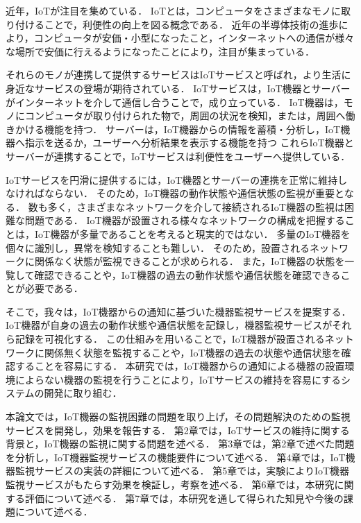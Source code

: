 
近年，IoTが注目を集めている．
IoTとは，コンピュータをさまざまなモノに取り付けることで，利便性の向上を図る概念である．
近年の半導体技術の進歩により，コンピュータが安価・小型になったこと，インターネットへの通信が様々な場所で安価に行えるようになったことにより，注目が集まっている．
\medskip

それらのモノが連携して提供するサービスはIoTサービスと呼ばれ，より生活に身近なサービスの登場が期待されている．
IoTサービスは，IoT機器とサーバーがインターネットを介して通信し合うことで，成り立っている．
IoT機器は，モノにコンピュータが取り付けられた物で，周囲の状況を検知，または，周囲へ働きかける機能を持つ．
サーバーは，IoT機器からの情報を蓄積・分析し，IoT機器へ指示を送るか，ユーザーへ分析結果を表示する機能を持つ
これらIoT機器とサーバーが連携することで，IoTサービスは利便性をユーザーへ提供している．
\medskip

IoTサービスを円滑に提供するには，IoT機器とサーバーの連携を正常に維持しなければならない．
そのため，IoT機器の動作状態や通信状態の監視が重要となる．
数も多く，さまざまなネットワークを介して接続されるIoT機器の監視は困難な問題である．
IoT機器が設置される様々なネットワークの構成を把握することは，IoT機器が多量であることを考えると現実的ではない．
多量のIoT機器を個々に識別し，異常を検知することも難しい．
そのため，設置されるネットワークに関係なく状態が監視できることが求められる．
また，IoT機器の状態を一覧して確認できることや，IoT機器の過去の動作状態や通信状態を確認できることが必要である．
\medskip

そこで，我々は，IoT機器からの通知に基づいた機器監視サービスを提案する．
IoT機器が自身の過去の動作状態や通信状態を記録し，機器監視サービスがそれら記録を可視化する．
この仕組みを用いることで，IoT機器が設置されるネットワークに関係無く状態を監視することや，IoT機器の過去の状態や通信状態を確認することを容易にする．
本研究では，IoT機器からの通知による機器の設置環境によらない機器の監視を行うことにより，IoTサービスの維持を容易にするシステムの開発に取り組む．
\medskip

本論文では，IoT機器の監視困難の問題を取り上げ，その問題解決のための監視サービスを開発し，効果を報告する．
第2章では，IoTサービスの維持に関する背景と，IoT機器の監視に関する問題を述べる．
第3章では，第2章で述べた問題を分析し，IoT機器監視サービスの機能要件について述べる．
第4章では，IoT機器監視サービスの実装の詳細について述べる．
第5章では，実験によりIoT機器監視サービスがもたらす効果を検証し，考察を述べる．
第6章では，本研究に関する評価について述べる．
第7章では，本研究を通して得られた知見や今後の課題について述べる．


